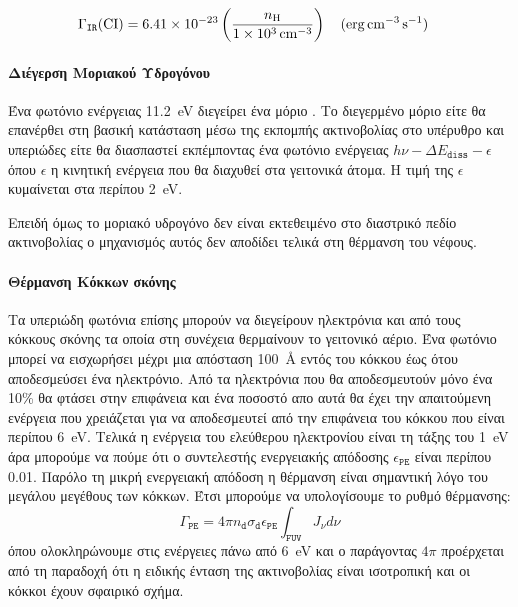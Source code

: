   \begin{equation}
 \Gamma _\mathtt{IR} (\ce{CI}) = \num{6.41e-23} \left( \frac{n_{\ce{H}}}{\SI{1e3}{cm^{-3}}} \right) \qq{(\si{erg.cm^{-3}.s^{-1}})} 
 \end{equation}
 
\paragraph{Διέγερση Μοριακού Υδρογόνου}
Ένα φωτόνιο ενέργειας \SI{11.2}{eV} διεγείρει ένα μόριο . Το διεγερμένο μόριο είτε θα επανέρθει στη βασική κατάσταση μέσω της εκπομπής ακτινοβολίας στο υπέρυθρο και υπεριώδες είτε θα διασπαστεί εκπέμποντας ένα φωτόνιο ενέργειας $h \nu - \Delta E _\mathtt{diss} -\epsilon$ όπου $\epsilon$ η κινητική ενέργεια που θα διαχυθεί στα γειτονικά άτομα. Η τιμή της $\epsilon$ κυμαίνεται στα περίπου \SI{2}{eV}. 

Επειδή όμως το μοριακό υδρογόνο δεν είναι εκτεθειμένο στο διαστρικό πεδίο ακτινοβολίας ο μηχανισμός αυτός δεν αποδίδει τελικά στη θέρμανση του νέφους.

\paragraph{Θέρμανση Κόκκων σκόνης}
Τα υπεριώδη φωτόνια επίσης μπορούν να διεγείρουν ηλεκτρόνια και από τους κόκκους σκόνης τα οποία στη συνέχεια θερμαίνουν το γειτονικό αέριο. Ένα φωτόνιο μπορεί να εισχωρήσει μέχρι μια απόσταση \SI{100}{\angstrom} εντός του κόκκου έως ότου αποδεσμεύσει ένα ηλεκτρόνιο. Από τα ηλεκτρόνια που θα αποδεσμευτούν μόνο ένα 10\% θα φτάσει στην επιφάνεια και ένα ποσοστό απο αυτά θα έχει την απαιτούμενη ενέργεια που χρειάζεται για να αποδεσμευτεί από την επιφάνεια του κόκκου που είναι περίπου \SI{6}{eV}. Τελικά η ενέργεια του ελεύθερου ηλεκτρονίου είναι τη τάξης του \SI{1}{eV} άρα μπορούμε να πούμε ότι ο συντελεστής ενεργειακής απόδοσης $\epsilon _\mathtt{PE}$ είναι περίπου \num{0.01}. Παρόλο τη μικρή ενεργειακή απόδοση η θέρμανση είναι σημαντική λόγο του μεγάλου μεγέθους των κόκκων. Έτσι μπορούμε να υπολογίσουμε το ρυθμό θέρμανσης:
\begin{equation}
\Gamma _\mathtt{PE}=4\pi n_\mathtt{d} \sigma _\mathtt{d} \epsilon _\mathtt{PE} \int _\mathtt{FUV} J_\nu d\nu
\end{equation}  
όπου ολοκληρώνουμε στις ενέργειες πάνω από \SI{6}{eV} και ο παράγοντας $4\pi$ προέρχεται από τη παραδοχή ότι η ειδικής ένταση της ακτινοβολίας είναι ισοτροπική και οι κόκκοι έχουν σφαιρικό σχήμα. 

